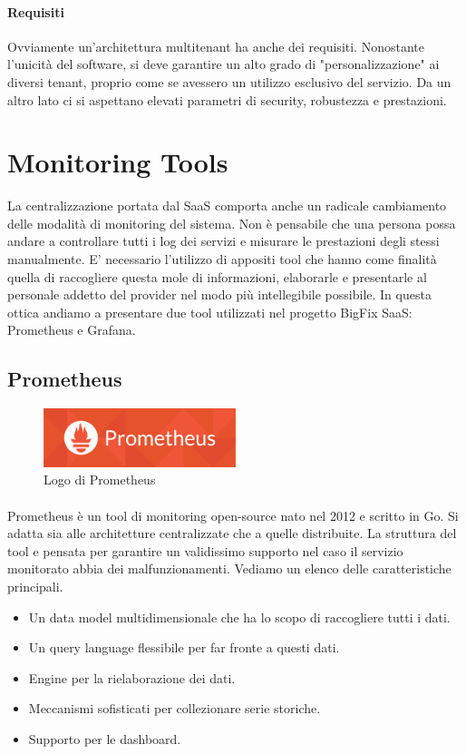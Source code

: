 \paragraph{Requisiti}
Ovviamente un'architettura multitenant ha anche dei requisiti. Nonostante l'unicità del software, si deve garantire un alto grado di "personalizzazione" ai diversi tenant, proprio come se avessero un utilizzo esclusivo del servizio. Da un altro lato ci si aspettano elevati parametri di security, robustezza e prestazioni.

\section{Monitoring Tools}
La centralizzazione portata dal SaaS comporta anche un radicale cambiamento delle modalità di monitoring del sistema. Non è pensabile che una persona possa andare a controllare tutti i log dei servizi e misurare le prestazioni degli stessi manualmente. E' necessario l'utilizzo di appositi tool che hanno come finalità quella di raccogliere questa mole di informazioni, elaborarle e presentarle al personale addetto del provider nel modo più intellegibile possibile. In questa ottica andiamo a presentare due tool utilizzati nel progetto BigFix SaaS: Prometheus e Grafana.
\subsection{Prometheus}
\begin{figure}[h!]
	\centering
	\includegraphics[width=0.5\textwidth,keepaspectratio=true]{capitoli/imgs/prometheuslogo.png}
	\caption{Logo di Prometheus}
\end{figure}
\paragraph{}
Prometheus è un tool di monitoring open-source nato nel 2012 e scritto in Go. Si adatta sia alle architetture centralizzate che a quelle distribuite. La struttura del tool e pensata per garantire un validissimo supporto nel caso il servizio monitorato abbia dei malfunzionamenti. Vediamo un elenco delle caratteristiche principali.
\begin{itemize}
	\item Un data model multidimensionale che ha lo scopo di raccogliere tutti i dati.
	\item Un query language flessibile per far fronte a questi dati.
	\item Engine per la rielaborazione dei dati.
	\item Meccanismi sofisticati per collezionare serie storiche.
	\item Supporto per le dashboard.
\end{itemize}
